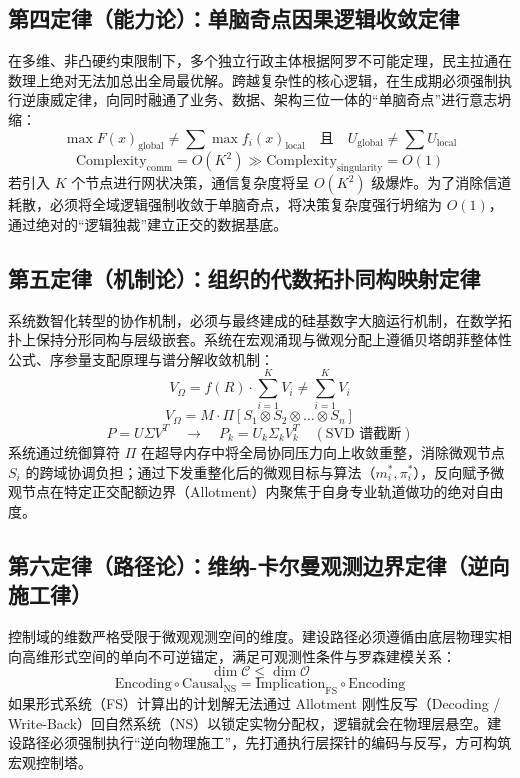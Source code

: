 \documentclass[11pt,a4paper]{article}
\begin{document}
\subsection*{第四定律（能力论）：单脑奇点因果逻辑收敛定律}
在多维、非凸硬约束限制下，多个独立行政主体根据阿罗不可能定理，民主拉通在数理上绝对无法加总出全局最优解。跨越复杂性的核心逻辑，在生成期必须强制执行逆康威定律，向同时融通了业务、数据、架构三位一体的“单脑奇点”进行意志坍缩：
\begin{equation}
    \max F(x)_{\text{global}} \neq \sum \max f_i(x)_{\text{local}} \quad \text{且} \quad U_{\text{global}} \neq \sum U_{\text{local}}
\end{equation}
\begin{equation}
    \text{Complexity}_{\text{comm}} = O(K^2) \gg \text{Complexity}_{\text{singularity}} = O(1)
\end{equation}
若引入 $K$ 个节点进行网状决策，通信复杂度将呈 $O(K^2)$ 级爆炸。为了消除信道耗散，必须将全域逻辑强制收敛于单脑奇点，将决策复杂度强行坍缩为 $O(1)$，通过绝对的“逻辑独裁”建立正交的数据基底。

\subsection*{第五定律（机制论）：组织的代数拓扑同构映射定律}
系统数智化转型的协作机制，必须与最终建成的硅基数字大脑运行机制，在数学拓扑上保持分形同构与层级嵌套。系统在宏观涌现与微观分配上遵循贝塔朗菲整体性公式、序参量支配原理与谱分解收敛机制：
\begin{equation}
    V_{\Omega} = f(R) \cdot \sum_{i=1}^{K} V_i \neq \sum_{i=1}^{K} V_i
\end{equation}
\begin{equation}
    V_{\Omega} = M \cdot \Pi \left[ S_1 \otimes S_2 \otimes \dots \otimes S_n \right]
\end{equation}
\begin{equation}
    P = U \Sigma V^T \quad \to \quad P_k = U_k \Sigma_k V_k^T \quad (\text{SVD 谱截断})
\end{equation}
系统通过统御算符 $\Pi$ 在超导内存中将全局协同压力向上收敛重整，消除微观节点 $S_i$ 的跨域协调负担；通过下发重整化后的微观目标与算法（$m_i^*, \pi_i^*$），反向赋予微观节点在特定正交配额边界（Allotment）内聚焦于自身专业轨道做功的绝对自由度。

\subsection*{第六定律（路径论）：维纳-卡尔曼观测边界定律（逆向施工律）}
控制域的维数严格受限于微观观测空间的维度。建设路径必须遵循由底层物理实相向高维形式空间的单向不可逆锚定，满足可观测性条件与罗森建模关系：
\begin{equation}
    \dim \mathcal{C} \le \dim \mathcal{O}
\end{equation}
\begin{equation}
    \text{Encoding} \circ \text{Causal}_{\text{NS}} = \text{Implication}_{\text{FS}} \circ \text{Encoding}
\end{equation}
如果形式系统（FS）计算出的计划解无法通过 Allotment 刚性反写（Decoding / Write-Back）回自然系统（NS）以锁定实物分配权，逻辑就会在物理层悬空。建设路径必须强制执行“逆向物理施工”，先打通执行层探针的编码与反写，方可构筑宏观控制塔。
\end{document}

